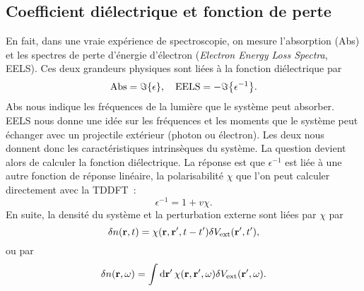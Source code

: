 %


\subsection{Coefficient diélectrique et fonction de perte}
\label{subsec-eels}
En fait, dans une vraie expérience de spectroscopie,
on mesure l'absorption (Abs) et les spectres de perte d'énergie d'électron
(\textit{Electron Energy Loss Spectra}, EELS).
Ces deux grandeurs physiques sont liées à la fonction diélectrique par~\cite{Sottile2003}
\begin{equation*}
  \textnormal{Abs} = \imaginary\qty{\epsilon},
  \quad
  \textnormal{EELS} = -\imaginary\qty{\epsilon^{-1}}.
\end{equation*}
Abs nous indique les fréquences de la lumière que le système peut absorber.
EELS nous donne une idée sur les fréquences et les moments
que le système peut échanger avec un projectile extérieur (photon ou électron).
Les deux nous donnent donc les caractéristiques intrinsèques du système.
La question devient alors de calculer la fonction diélectrique. La réponse est que
$\epsilon^{-1}$ est liée à une autre fonction de réponse linéaire,
la polarisabilité $\chi$ que l'on peut calculer directement
avec la TDDFT~\cite{Martin2004, Sottile2003}:
\begin{equation}
  \label{epsilon}
  \epsilon^{-1} = 1+ v\chi.
\end{equation}
En suite, la densité du système et la perturbation externe sont liées par $\chi$ par
\begin{equation}
  \delta n(\vb{r}, t) = \chi(\vb{r}, \vb{r}', t-t')\delta V_{\textnormal{ext}}(\vb{r}', t'),
\end{equation}
ou par
\begin{equation}
  \delta n(\vb{r}, \omega) = \int\dd{\vb{r}'}\chi(\vb{r}, \vb{r}', \omega)\delta V_{\textnormal{ext}}(\vb{r}', \omega).
\end{equation}


